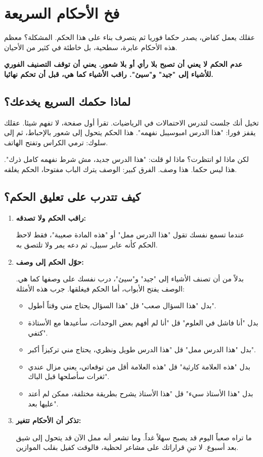 \documentclass[12pt,a4paper]{book}
\newcommand{\importantAr}[1]{%
	\begin{important}
		\bfseries #1
	\end{important}
}
\begin{document}
	\section{فخ الأحكام السريعة}
	\label{sec:non-judging}
	
	عقلك يعمل كقاض، يصدر حكما فوريا ثم يتصرف بناء على هذا الحكم. المشكلة؟ معظم هذه الأحكام عابرة، سطحية، بل خاطئة في كثير من الأحيان.
	
	\importantAr{عدم الحكم لا يعني أن تصبح بلا رأي أو بلا شعور. يعني أن توقف التصنيف الفوري للأشياء إلى "جيد" و"سيئ". راقب الأشياء كما هي، قبل أن تحكم نهائيا.}
	
	\subsection{لماذا حكمك السريع يخدعك؟}
	
	تخيل أنك جلست لتدرس الاحتمالات في الرياضيات. تقرأ أول صفحة، لا تفهم شيئا. عقلك يقفز فورا: "هذا الدرس امبوسيبل نفهمه". هذا الحكم يتحول إلى شعور بالإحباط، ثم إلى سلوك: ترمي الكراس وتفتح الهاتف.
	
	لكن ماذا لو انتظرت؟ ماذا لو قلت: "هذا الدرس جديد، مش شرط نفهمه كامل ذرك". هذا ليس حكما. هذا وصف. الفرق كبير: الوصف يترك الباب مفتوحا، الحكم يغلقه.
	
	\subsection{كيف تتدرب على تعليق الحكم؟}
	
	\begin{enumerate}
		\item \textbf{راقب الحكم ولا تصدقه:}
		
		عندما تسمع نفسك تقول "هذا الدرس ممل" أو "هذه المادة صعيبة"، فقط لاحظ الحكم كأنه عابر سبيل، ثم دعه يمر ولا تلتصق به.
		
		\item \textbf{حوّل الحكم إلى وصف:}
		
		بدلاً من أن تصنف الأشياء إلى "جيد" و"سيئ"، درب نفسك على وصفها كما هي. الوصف يفتح الأبواب، أما الحكم فيغلقها. جرب هذه الأمثلة:
		
		\begin{itemize}
			\item بدل "هذا السؤال صعب" قل "هذا السؤال يحتاج مني وقتاً أطول".
			\item بدل "أنا فاشل في العلوم" قل "أنا لم أفهم بعض الوحدات، سأعيدها مع الأستاذة كتفي".
			\item بدل "هذا الدرس ممل" قل "هذا الدرس طويل ونظري، يحتاج مني تركيزاً أكبر".
			\item بدل "هذه العلامة كارثية" قل "هذه العلامة أقل من توقعاتي،  يعني مزال عندي ثغرات سأصلحها قبل الباك".
			\item بدل "هذا الأستاذ سيء" قل "هذا الأستاذ يشرح بطريقة مختلفة،  ممكن لم أعتد عليها بعد".
		\end{itemize}
		
		\item \textbf{تذكر أن الأحكام تتغير:}
		
		ما تراه صعباً اليوم قد يصبح سهلاً غداً. وما تشعر أنه ممل الآن قد يتحول إلى شيق بعد أسبوع. لا تبنِ قراراتك على مشاعر لحظية، فالوقت كفيل بقلب الموازين.
	\end{enumerate}
	
\end{document}
